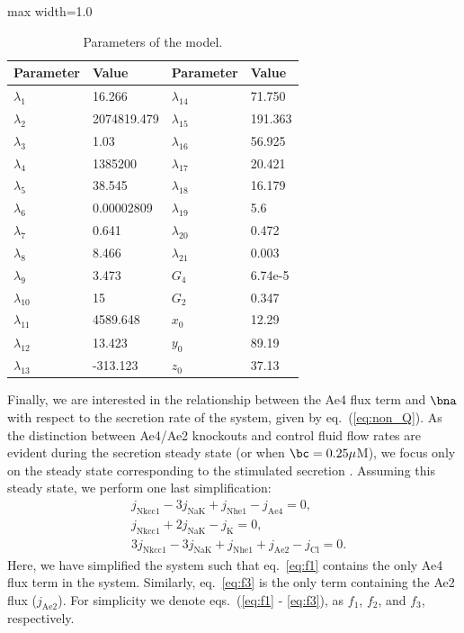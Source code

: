 \begin{table}
\centering
\captionsetup{justification=centering} 
\caption{Parameters of the model.}
\begin{adjustbox}{max width=1.0\textwidth}
\begin{tabular}{@{}llll@{}}
\toprule 
\bf{Parameter}	& \bf{Value}	 	&\bf{Parameter} 			& \bf{Value}		\\ \midrule
$\lambda_1$		& 16.266			& $\lambda_{14}$			& 71.750	 		\\ 
$\lambda_2$		& 2074819.479	& $\lambda_{15}$			& 191.363		\\
$\lambda_3$ 		& 1.03			& $\lambda_{16}$			& 56.925	 		\\
$\lambda_4$ 		& 1385200		& $\lambda_{17}$			& 20.421			\\
$\lambda_5$ 		& 38.545			& $\lambda_{18}$			& 16.179			\\	
$\lambda_6$ 		& 0.00002809		& $\lambda_{19}$ 		& 5.6			\\	
$\lambda_7$		& 0.641			& $\lambda_{20}$			& 0.472			\\
$\lambda_8$		& 8.466			& $\lambda_{21}$			& 0.003			\\
$\lambda_9$		& 3.473			& $G_{4}$	& 6.74e-5		\\		
$\lambda_{10}$	& 15	 			& $G_{2}$	& 0.347			\\
$\lambda_{11}$ 	& 4589.648		& $x_0$ 					& 12.29	 		\\
$\lambda_{12}$	& 13.423			& $y_0$ 					& 89.19			\\
$\lambda_{13}$	& -313.123		& $z_0$ 					& 37.13			\\ 										
\bottomrule
\end{tabular}
\end{adjustbox}
\label{table:lambda}
\end{table}

Finally, we are interested in the relationship between the Ae4 flux term and $\bna$ with respect to the secretion rate of the system, given by eq.~(\ref{eq:non_Q}). As the distinction between Ae4/Ae2 knockouts and control fluid flow rates are evident during the secretion steady state (or when $\bc = 0.25 \mu$M), we focus only on the steady state corresponding to the stimulated secretion \citep{siguenza2017Ae4}. Assuming this steady state, we perform one last simplification: 
\begin{align}
\label{eq:f1}
& j_{\text{Nkcc1}}-3j_{\text{NaK}}+ j_{\text{Nhe1}}-j_{\text{Ae4}} =0,\\
\label{eq:f2}
&j_{\text{Nkcc1}}+2 j_{\text{NaK}}-j_{\text{K}} =0,\\
\label{eq:f3}
& 3j_{\text{Nkcc1}}-3j_{\text{NaK}}+j_{\text{Nhe1}}+j_{\text{Ae2}}-j_{\text{Cl}}=0.
\end{align} 
Here, we have simplified the system such that eq.~\eqref{eq:f1} contains the only Ae4 flux term in the system. Similarly, eq.~\eqref{eq:f3} is the only term containing the Ae2 flux ($j_{\text{Ae2}}$). For simplicity we denote eqs.~(\ref{eq:f1} - \ref{eq:f3}), as $f_1$, $f_2$, and $f_3$, respectively. 

